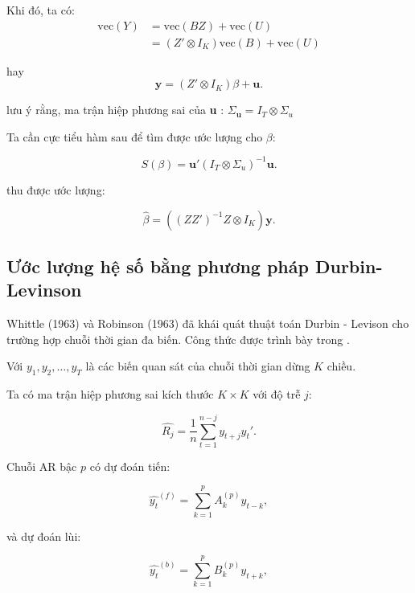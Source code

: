 Khi đó, ta có: 
\begin{align*}
        \text{vec}(Y) & = \text{vec}(BZ) +\text{vec}(U) \\ 
        & = (Z' \otimes I_K) \text{vec}(B) + \text{vec}(U)
\end{align*}

hay
\begin{equation}
    \textbf{y} = (Z' \otimes I_K) \beta + \textbf{u}.
\end{equation}

lưu ý rằng, ma trận hiệp phương sai của \textbf{u} : $\Sigma_{\textbf{u}} = I_T \otimes \Sigma_u$

Ta cần cực tiểu hàm sau để tìm được ước lượng cho $\beta$:

\begin{equation}
    S(\beta) = \textbf{u}' (I_T \otimes \Sigma_u)^{-1} \textbf{u}.
\end{equation}

thu được ước lượng:

\begin{equation}
    \hat{\beta} = ((ZZ')^{-1}Z \otimes I_K )\textbf{y}.
\end{equation}



\subsection{Ước lượng hệ số bằng phương pháp  Durbin-Levinson}

Whittle (1963) và Robinson (1963) đã khái quát thuật toán Durbin - Levison cho trường hợp chuỗi thời gian đa biến. Công thức được trình bày trong \cite{Jones1978}.

Với $y_1, y_2, \dots, y_T$ là các biến quan sát của chuỗi thời gian dừng $K$ chiều. 

Ta có ma trận hiệp phương sai kích thước $K \times K$ với độ trễ $j$:

\begin{equation}
    \hat{R_j} = \frac{1}{n} \sum_{t = 1} ^{n-j} y_{t+j} y_t '.
\end{equation}

Chuỗi AR bậc $p$ có dự đoán tiến:

\begin{equation}
    \hat{y_t}^{(f)} = \sum_{k = 1}^p A_k^{(p)} y_{t-k},
\end{equation}

và dự đoán lùi:

\begin{equation}
    \hat{y_t}^{(b)} = \sum_{k=1}^p B_k^{(p)} y_{t+k}, 
\end{equation}

